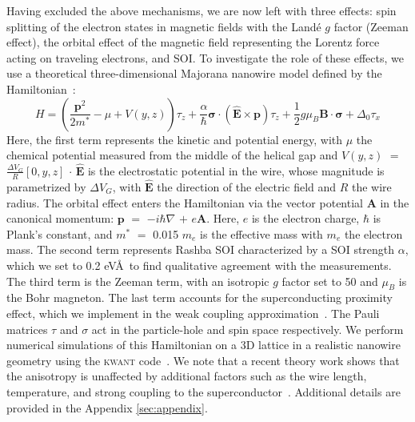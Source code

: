 Having excluded the above mechanisms, we are now left with three effects: spin splitting of the electron \mbox{states} in magnetic fields with the Land\'e $g$ factor (Zeeman eff\mbox{ect)}, the orbital effect of the magnetic field representing the Lorentz force acting on traveling electrons, and SOI.
To investigate the role of these effects, we use a theoretical three-dimensional Majorana nanowire model defined by the Hamiltonian~\cite{Lutchyn2010,Oreg2010,Nijholt2016}:
\begin{equation*}
H = \left(\frac{\mathbf{p}^2}{2m^*}-\mu+V(y,z)\right) \tau_z + \frac{\alpha}{\hbar} \boldsymbol{\sigma} \cdot \mathbf{(\hat{E}\times p)} \tau_z + \frac{1}{2}g\mu_B\mathbf{B\cdot}\boldsymbol{\sigma}+\Delta_0 \tau_x
\end{equation*}
Here, the first term represents the kinetic and potential energy, with $\mu$ the chemical potential measured from the middle of the helical gap and $V(y,z)$ $=$ $\frac{\Delta V_G}{R}[0,y,z]$ $\cdot$ $\mathbf{\hat{E}}$ is the electrostatic potential in the wire, whose magnitude is parametrized by $\Delta V_G$, with $\mathbf{\hat{E}}$ the direction of the electric field and $R$ the wire radius.
The orbital effect enters the Hamiltonian via the vector potential $\mathbf{A}$ in the canonical momentum: $\mathbf{p}$ $=$ $-i\hbar \nabla$ $+$ $e\mathbf{A}$.
Here, $e$ is the electron charge, $\hbar$ is Plank's constant, and $m^*$ $=$ 0.015 $m_e$ is the effective mass with $m_e$ the electron mass.
The second term represents Rashba SOI characterized by a SOI strength $\alpha$, which we set to 0.2 eV\AA\ to find qualitative agreement with the measurements.
The third term is the Zeeman term, with an isotropic $g$ factor set to 50 and $\mu_B$ is the Bohr magneton.
The last term accounts for the superconducting proximity effect, which we implement in the weak coupling approximation~\cite{Nijholt2016}.
The Pauli matrices $\tau$ and $\sigma$ act in the particle-hole and spin space respectively.
We perform numerical simulations of this Hamiltonian on a 3D lattice in a realistic nanowire geometry using the \textsc{kwant} code~\cite{Groth2014}.
We note that a recent theory work shows that the anisotropy is unaffected by additional factors such as the wire length, temperature, and strong coupling to the superconductor~\cite{Liu2019}.
Additional details are provided in the Appendix \ref{sec:appendix}.

